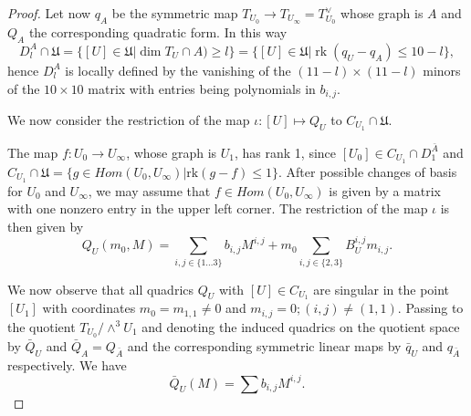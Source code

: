 \documentclass[a4paper,11pt]{amsart}
\theoremstyle{definition}
\numberwithin{equation}{section}
\numberwithin{equation}{section} \theoremstyle{definition}
\begin{document}
\begin{proof}
  Let now $q_A$ be the symmetric map  $T_{U_0}\to T_{U_\infty}=T_{U_0}^{\vee}$ whose graph is $A$ and $Q_A$ the corresponding quadratic form.
  In this way
  $$D_l^A\cap\mathfrak{U}=\{[U]\in \mathfrak{U} |\dim T_U\cap A)\geq l\}=\{[U]\in \mathfrak{U} |\operatorname{rk} (q_U-q_A)\leq 10-l\},$$
  hence $D_l^A$ is locally defined by the vanishing of the $(11-l)\times (11-l)$ minors of the $10\times 10$ matrix with entries being polynomials in $b_{i,j}$.

We now consider the restriction of the map $\iota : [U] \mapsto Q_U$ to  $C_{U_1}\cap \mathfrak{U}$.  

The map $f: U_0\to U_{\infty}$, whose graph is $U_1$, has rank 1, since $[U_0]\in C_{U_1}\cap D_1^{\bar{A}}$ and $C_{U_1}\cap \mathfrak{U}=\{g\in Hom(U_0,U_\infty)| {\mathrm{rk}} (g-f)\leq 1\}$. 
After possible changes of basis for  $U_0$ and $U_{\infty}$, we may assume that $f\in Hom(U_0,U_\infty)$ is given by a matrix with one nonzero entry in the upper left corner.
The restriction of the map  $\iota$ is then given by
\begin{equation} \label{equationsqu}
Q_U(m_0,M)=\sum_{i,j\in\{1\dots3\}}  b_{i,j} M^{i,j}+ m_0 \sum_{i,j\in\{2,3\}} B_U^{i,j}m_{i,j}.
\end{equation}

We now observe that all quadrics $Q_U$ with $[U]\in C_{U_1}$ are singular in the point $[U_1]$ with coordinates $m_0=m_{1,1}\not=0$ and $m_{i,j}=0; (i,j)\not=(1,1) $. Passing to the quotient $T_{U_0}/\wedge^3 U_1$ and denoting the induced quadrics on the quotient space by $\bar{Q}_U$ and $\bar{Q}_{A}=Q_{\bar{A}}$ and the corresponding symmetric linear maps by $\bar{q}_U$ and $q_{\bar{A}}$ respectively. We have 
\begin{equation}\label{9x9quadrics}
\bar{Q}_U(M)=\sum b_{i,j} M^{i,j}.
\end{equation}


\end{proof}
\end{document}
